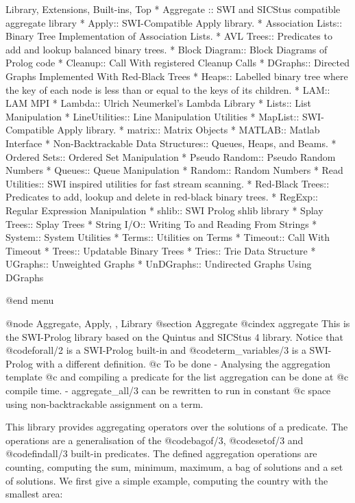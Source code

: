{{{{{{{{{Library, Extensions, Built-ins, Top
* Aggregate :: SWI and SICStus compatible aggregate library
* Apply:: SWI-Compatible Apply library.
* Association Lists:: Binary Tree Implementation of Association Lists.
* AVL Trees:: Predicates to add and lookup balanced binary  trees.
* Block Diagram:: Block Diagrams of Prolog code
* Cleanup:: Call With registered Cleanup Calls
* DGraphs:: Directed Graphs Implemented With Red-Black Trees
* Heaps:: Labelled binary tree where the key of each node is less
    than or equal to the keys of its children.
* LAM:: LAM MPI
* Lambda:: Ulrich Neumerkel's Lambda Library
* Lists:: List Manipulation
* LineUtilities:: Line Manipulation Utilities
* MapList:: SWI-Compatible Apply library.
* matrix:: Matrix Objects
* MATLAB:: Matlab Interface
* Non-Backtrackable Data Structures:: Queues, Heaps, and Beams.
* Ordered Sets:: Ordered Set Manipulation
* Pseudo Random:: Pseudo Random Numbers
* Queues:: Queue Manipulation
* Random:: Random Numbers
* Read Utilities:: SWI inspired utilities for fast stream scanning.
* Red-Black Trees:: Predicates to add, lookup and delete in red-black binary  trees.
* RegExp:: Regular Expression Manipulation
* shlib:: SWI Prolog shlib library
* Splay Trees:: Splay Trees
* String I/O:: Writing To and Reading From Strings
* System:: System Utilities
* Terms:: Utilities on Terms
* Timeout:: Call With Timeout
* Trees:: Updatable Binary Trees
* Tries:: Trie Data Structure
* UGraphs:: Unweighted Graphs
* UnDGraphs:: Undirected Graphs Using DGraphs


@end menu

 
@node Aggregate, Apply, , Library
@section Aggregate
@cindex aggregate
This is the SWI-Prolog library based on  the Quintus and SICStus 4
library. Notice that  @code{forall/2}
is a SWI-Prolog built-in and @code{term_variables/3} is a SWI-Prolog with a
different definition.  @c To be done - Analysing the aggregation template
@c and compiling a predicate for the list aggregation can be done at
@c compile time.  - aggregate_all/3 can be rewritten to run in constant
@c space using non-backtrackable assignment on a term.

This library provides aggregating operators over the solutions of a
predicate. The operations are a generalisation of the @code{bagof/3},
@code{setof/3} and @code{findall/3} built-in predicates. The defined
aggregation operations are counting, computing the sum, minimum,
maximum, a bag of solutions and a set of solutions. We first give a
simple example, computing the country with the smallest area:

}}}}}}}}}
